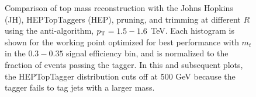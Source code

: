 \begin{figure}
\begin{center}
\caption{Comparison of top mass reconstruction with the Johns Hopkins (JH), HEPTopTaggers (HEP), pruning, and trimming at different $R$ using the anti-\kT algorithm, $p_{\rm T}=1.5-1.6$ TeV. Each histogram is shown for the working point optimized for best performance with $m_t$ in the $0.3-0.35$ signal efficiency bin, and is normalized to the fraction of events passing the tagger. In this and subsequent plots, the HEPTopTagger distribution cuts off at 500 GeV because the tagger fails to tag jets with a larger mass.}
\label{fig:topmass_histogram_HEP_JH}
\end{center}
\end{figure}

